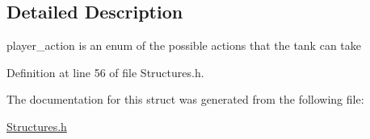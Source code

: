 \subsection{Detailed Description}
player\+\_\+action is an enum of the possible actions that the tank can take 

Definition at line 56 of file Structures.\+h.



The documentation for this struct was generated from the following file\+:\begin{DoxyCompactItemize}
\item 
\hyperlink{_structures_8h}{Structures.\+h}\end{DoxyCompactItemize}
